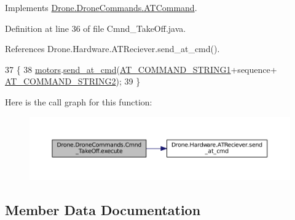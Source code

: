 Implements \hyperlink{interface_drone_1_1_drone_commands_1_1_a_t_command_a5205ae7a2269e1a82923c166322e1374}{Drone.\+Drone\+Commands.\+A\+T\+Command}.



Definition at line 36 of file Cmnd\+\_\+\+Take\+Off.\+java.



References Drone.\+Hardware.\+A\+T\+Reciever.\+send\+\_\+at\+\_\+cmd().


\begin{DoxyCode}
37     \{
38         \hyperlink{class_drone_1_1_drone_commands_1_1_cmnd___take_off_a36070de41a3dc86f56df6a987050cf93}{motors}.\hyperlink{class_drone_1_1_hardware_1_1_a_t_reciever_a93352d75209626cf62bde294b35f9120}{send\_at\_cmd}(\hyperlink{class_drone_1_1_drone_commands_1_1_cmnd___take_off_a81d9c1d947903cb7033f02d0fc50b29a}{AT\_COMMAND\_STRING1}+sequence+
      \hyperlink{class_drone_1_1_drone_commands_1_1_cmnd___take_off_a6a0828ac3a68db7162e571a9de31d14a}{AT\_COMMAND\_STRING2});
39     \}
\end{DoxyCode}


Here is the call graph for this function\+:\nopagebreak
\begin{figure}[H]
\begin{center}
\leavevmode
\includegraphics[width=350pt]{class_drone_1_1_drone_commands_1_1_cmnd___take_off_a53cd5804d2553dd77d31b1934ea546ac_cgraph}
\end{center}
\end{figure}




\subsection{Member Data Documentation}
\hypertarget{class_drone_1_1_drone_commands_1_1_cmnd___take_off_a81d9c1d947903cb7033f02d0fc50b29a}{}
